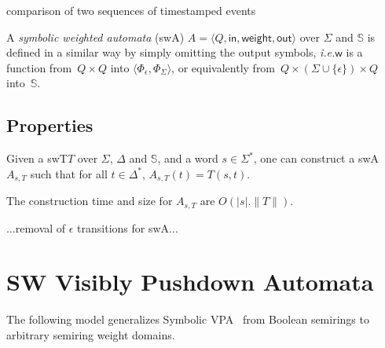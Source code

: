 \documentclass[runningheads]{llncs}
\def\ie{\textit{i.e.}\xspace}
\def\<#1>{\langle #1 \rangle}
\newcommand{\Semiring}{\mathbb{S}}
\def\SWT{\textsf{swT}\xspace}
\def\SWA{\textsf{swA}\xspace}
\def\weight{\mathsf{weight}}
\def\wei{\mathsf{w}}
\def\init{\mathsf{in}}
\def\final{\mathsf{out}}
\begin{document}
\begin{example}
comparison of two sequences of timestamped events      
\end{example}

\noindent
A \emph{symbolic weighted automata} (\SWA) $A = \< Q, \init, \weight, \final >$
over $\Sigma$ and $\Semiring$ 
is defined in a similar way by simply omitting the output symbols,
\ie $\wei$ is a function from~$Q \times Q$ into %
$\< \Phi_\epsilon, \Phi_\Sigma >$, 
or equivalently from~$Q \times (\Sigma \cup \{ \epsilon \}) \times Q$ into~$\Semiring$.

      


\subsection{Properties}

\begin{proposition}
Given a \SWT $T$ 
over $\Sigma$, $\Delta$ and $\Semiring$, 
and a word $s \in \Sigma^*$, 
one can construct a \SWA 
$A_{s, T}$ such that for all $t \in \Delta^*$, 
$A_{s, T}(t) = T(s, t)$.
\end{proposition}
The construction time and size for $A_{s, T}$ are $O(| s | . \| T \|)$.



\begin{proposition}
      ...removal of $\epsilon$ transitions for \SWA...
      \end{proposition}
      
      


\section{SW Visibly Pushdown Automata}
\label{section:SWVPA}\label{sec:SWVPA}
The following model generalizes Symbolic VPA~\cite{dAntonyAlur14SVPDA}
from Boolean semirings to arbitrary semiring weight domains.
\end{document}
